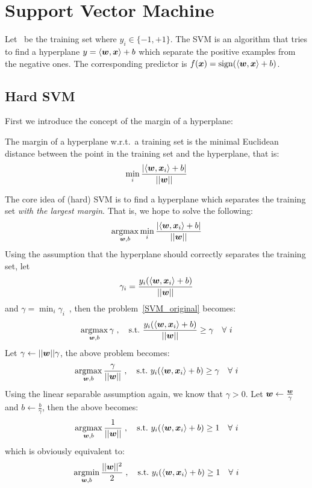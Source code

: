 \section{Support Vector Machine}
Let \dataset\ be the training set where $y_i \in\{-1, +1\}$. The SVM is an algorithm that tries to find a 
hyperplane $y = \langle\boldsymbol{w}, \boldsymbol{x}\rangle + b$ which separate the positive examples from the negative ones. The 
corresponding predictor is $f(\boldsymbol{x}) = \operatorname{sign}(\langle\boldsymbol{w}, \boldsymbol{x}\rangle + b)$.

\subsection{Hard SVM}
First we introduce the concept of the margin of a hyperplane:
\begin{df}[Margin]
    The margin of a hyperplane w.r.t.\ a training set is the minimal Euclidean distance between the point in the 
    training set and the hyperplane, that is:
    \begin{equation*}
    \min_i \frac{|\langle\boldsymbol{w}, \boldsymbol{x}_i\rangle + b|}{||\boldsymbol{w}||}
    \end{equation*}
\end{df}

The core idea of (hard) SVM is to find a hyperplane which separates the training set
\textit{with the largest margin}. That is, we hope to solve the following:
\begin{equation}\label{SVM_original}
    \operatorname*{argmax}_{\boldsymbol{w}, b}\min_i \frac{|\langle\boldsymbol{w}, \boldsymbol{x}_i\rangle + b|}{||\boldsymbol{w}||}
\end{equation}
Using the assumption that the hyperplane should correctly separates the training set, let
$$\gamma_i = \frac{y_i(\langle\boldsymbol{w}, \boldsymbol{x}_i\rangle + b)}{||\boldsymbol{w}||}$$
and $\gamma =\displaystyle \min_i \gamma_i$~, then the problem~\eqref{SVM_original} becomes:
\begin{equation}
    \operatorname*{argmax}_{\boldsymbol{w}, b} \gamma\;,\quad \text{s.t.\ } \frac{y_i(\langle\boldsymbol{w}, \boldsymbol{x}_i\rangle + b)}{||\boldsymbol{w}||} \geq \gamma
    \quad\forall\ i
\end{equation}
Let $\gamma \gets ||\boldsymbol{w}||\gamma$, the above problem becomes:
\begin{equation}
    \operatorname*{argmax}_{\boldsymbol{w}, b} \frac{\gamma}{||\boldsymbol{w}||}\;,\quad \text{s.t.\ } y_i(\langle\boldsymbol{w}, \boldsymbol{x}_i\rangle + b) \geq \gamma
    \quad\forall\ i
\end{equation}
Using the linear separable assumption again, we know that $\gamma > 0$. Let $\boldsymbol{w} \gets \frac{\boldsymbol{w}}{\gamma}$
and $b \gets \frac{b}{\gamma}$, then the above becomes:
\begin{equation}\label{SVM_argmax}
    \operatorname*{argmax}_{\boldsymbol{w}, b} \frac{1}{||\boldsymbol{w}||}\;,\quad \text{s.t.\ } y_i(\langle\boldsymbol{w}, \boldsymbol{x}_i\rangle + b) \geq 1
    \quad\forall\ i
\end{equation}
which is obviously equivalent to:
\begin{equation}\label{hard_SVM}
    \operatorname*{argmin}_{\boldsymbol{w}, b} \frac{||\boldsymbol{w}||^2}{2}\;,\quad \text{s.t.\ } y_i(\langle\boldsymbol{w}, \boldsymbol{x}_i\rangle + b) \geq 1
    \quad\forall\ i
\end{equation}

